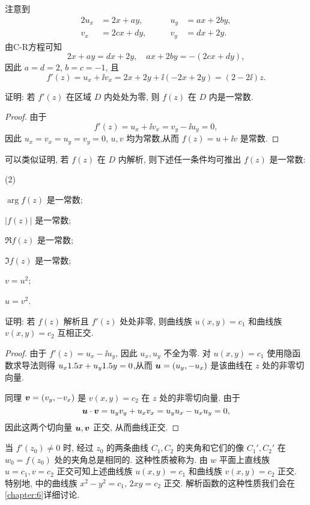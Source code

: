 \begin{solution}
  注意到
  \begin{alignat*}{2}
    u_x&=2x+ay,\qquad&u_y&=ax+2by,\\
    v_x&=2cx+dy,\qquad&v_y&=dx+2y.
  \end{alignat*}
  由C-R方程可知
  \[
    2x+ay=dx+2y,\quad ax+2by=-(2cx+dy),
  \]
  因此 $a=d=2$, $b=c=-1$, 且
  \[
     f'(z)
    =u_x+\ii v_x
    =2x+2y+\ii(-2x+2y)
    =(2-2\ii)z.
  \]
\end{solution}

\begin{example}
  \label{exam:zero-deriv-constant}
  证明: 若 $f'(z)$ 在区域 $D$ 内处处为零, 则 $f(z)$ 在 $D$ 内是一常数.
\end{example}

\begin{proof}
  由于
  \[
    f'(z)=u_x+\ii v_x=v_y-\ii u_y=0,
  \]
  因此 $u_x=v_x=u_y=v_y=0$, $u,v$ 均为常数,从而  $f(z)=u+\ii v$ 是常数.
\end{proof}

可以类似证明, 若 $f(z)$ 在 $D$ 内解析, 则下述任一条件均可推出 $f(z)$ 是一常数:
\begin{subexample}(2)
  \item $\arg{f(z)}$ 是一常数;
  \item $|f(z)|$ 是一常数;
  \item $\Re{f(z)}$ 是一常数;
  \item $\Im{f(z)}$ 是一常数;
  \item $v=u^2$;
  \item $u=v^2$.
\end{subexample}

\begin{example}
  \label{exam:orthogonal-curve}
  证明: 若 $f(z)$ 解析且 $f'(z)$ 处处非零, 则曲线族 $u(x,y)=c_1$ 和曲线族 $v(x,y)=c_2$ 互相正交.
\end{example}

\begin{proof}
  由于 $f'(z)=u_x-\ii u_y$, 因此 $u_x,u_y$ 不全为零.
  对 $u(x,y)=c_1$ 使用隐函数求导法则得 $u_x1.5 x+u_y1.5 y=0$,从而 ${\boldsymbol{u}}=(u_y,-u_x)$ 是该曲线在 $z$ 处的非零切向量.

  同理 ${\boldsymbol{v}}=(v_y,-v_x)$ 是 $v(x,y)=c_2$ 在 $z$ 处的非零切向量.
  由于
  \[
    {\boldsymbol{u}}\cdot{\boldsymbol{v}}=u_yv_y+u_xv_x=u_yu_x-u_xu_y=0,
  \]
  因此这两个切向量 ${\boldsymbol{u}},{\boldsymbol{v}}$ 正交, 从而曲线正交.
\end{proof}

当 $f'(z_0)\neq 0$ 时, 经过 $z_0$ 的两条曲线 $C_1,C_2$ 的夹角和它们的像 $C_1',C_2'$ 在 $w_0=f(z_0)$ 处的夹角总是相同的.
这种性质被称为.
由 $w$ 平面上直线族 $u=c_1,v=c_2$ 正交可知上述曲线族 $u(x,y)=c_1$ 和曲线族 $v(x,y)=c_2$ 正交.
特别地,  中的曲线族 $x^2-y^2=c_1$, $2xy=c_2$ 正交.
解析函数的这种性质我们会在\ref{chapter:6}详细讨论.



